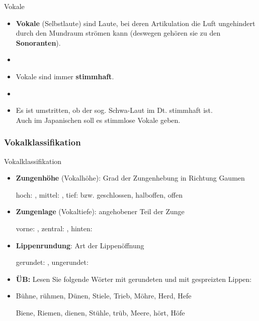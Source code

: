 \begin{frame}{Vokale}

	\begin{itemize}
		\item \textbf{Vokale} (Selbstlaute) sind Laute, bei deren Artikulation die Luft ungehindert durch den Mundraum strömen kann (deswegen gehören sie zu den \textbf{Sonoranten}).
		\item[]
		\item Vokale sind \idR immer \textbf{stimmhaft}.
		\item[]
		\item Es ist umstritten, ob der sog. Schwa-Laut im Dt. \textipa{[ @ ]} stimmhaft
                  ist.\\
                  Auch im Japanischen soll es stimmlose Vokale geben.
	\end{itemize}
	
\end{frame}


\subsubsection{Vokalklassifikation}

\begin{frame}{Vokalklassifikation}

	\begin{itemize}
		\item \textbf{Zungenhöhe} (Vokalhöhe): Grad der Zungenhebung in Richtung Gaumen

		\ea hoch: \textipa{[ i: ]}, mittel: \textipa{[ o: ]}, tief: \textipa{[ a: ]} bzw. geschlossen, halboffen, offen
		\z

\pause 

		\item \textbf{Zungenlage} (Vokaltiefe): angehobener Teil der Zunge

		\ea vorne: \textipa{[ i: ]}, zentral: \textipa{[ a: ]}, hinten: \textipa{[ u: ]}
		\z

\pause 

		\item \textbf{Lippenrundung}: Art der Lippenöffnung

		\ea gerundet: \textipa{[ o: ]}, ungerundet: \textipa{[ i: ]}
		\z

		\bigskip
                
		\item\textbf{ÜB:} Lesen Sie folgende Wörter mit gerundeten und mit gespreizten Lippen:
		\item[] Bühne, rühmen, Dünen, Stiele, Trieb, Möhre, Herd, Hefe
                  \pause
                  
                        Biene, Riemen, dienen, Stühle, trüb, Meere, hört, Höfe
	\end{itemize}
	
\end{frame}


